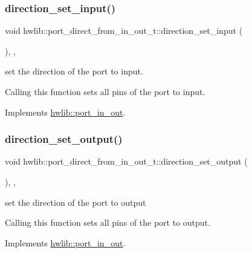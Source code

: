 \subsubsection{\texorpdfstring{direction\+\_\+set\+\_\+input()}{direction\_set\_input()}}
{\footnotesize\ttfamily void hwlib\+::port\+\_\+direct\+\_\+from\+\_\+in\+\_\+out\+\_\+t\+::direction\+\_\+set\+\_\+input (\begin{DoxyParamCaption}{ }\end{DoxyParamCaption})\hspace{0.3cm}{\ttfamily [inline]}, {\ttfamily [override]}, {\ttfamily [virtual]}}

set the direction of the port to input.

Calling this function sets all pins of the port to input. 

Implements \hyperlink{classhwlib_1_1port__in__out_ac7a9611410ddb9fd5d8e2dd15bff0a3f}{hwlib\+::port\+\_\+in\+\_\+out}.

\mbox{\label{classhwlib_1_1port__direct__from__in__out__t_a8702543e5a779026dd0b8602aaf5ae56}} 
\subsubsection{\texorpdfstring{direction\+\_\+set\+\_\+output()}{direction\_set\_output()}}
{\footnotesize\ttfamily void hwlib\+::port\+\_\+direct\+\_\+from\+\_\+in\+\_\+out\+\_\+t\+::direction\+\_\+set\+\_\+output (\begin{DoxyParamCaption}{ }\end{DoxyParamCaption})\hspace{0.3cm}{\ttfamily [inline]}, {\ttfamily [override]}, {\ttfamily [virtual]}}

set the direction of the port to output

Calling this function sets all pins of the port to output. 

Implements \hyperlink{classhwlib_1_1port__in__out_a515b4a6bbde4f2df5bb11cda41234fe4}{hwlib\+::port\+\_\+in\+\_\+out}.

\mbox{\label{classhwlib_1_1port__direct__from__in__out__t_a59745ee886092e4ff81906aafedbcfdd}} 
